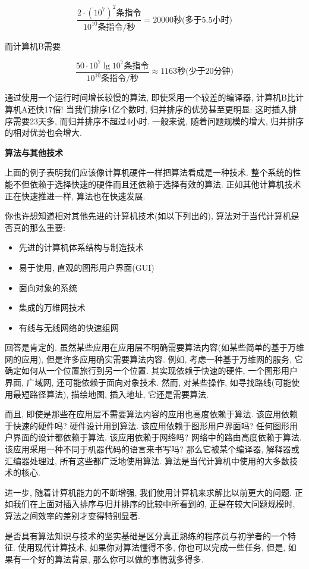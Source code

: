 \documentclass[oneside,10pt,fontset=none]{ctexbook}
\numberwithin{definition}{chapter}
\numberwithin{theorem}{chapter}
\numberwithin{proof}{chapter}
\begin{document}
$$
\frac{2\cdot (10^7)^2\text{条指令}}{10^10\text{条指令/秒}} = 20000\text{秒(多于5.5小时)}
$$

而计算机B需要

$$
\frac{50\cdot 10^7\lg{10^7}\text{条指令}}{10^10\text{条指令/秒}} \approx 1163\text{秒(少于20分钟)}
$$

通过使用一个运行时间增长较慢的算法, 即使采用一个较差的编译器, 计算机B比计算机A还快17倍! 当我们排序1亿个数时, 归并排序的优势甚至更明显: 这时插入排序需要23天多, 而归并排序不超过4小时. 一般来说, 随着问题规模的增大, 归并排序的相对优势也会增大.

\textbf{算法与其他技术}

上面的例子表明我们应该像计算机硬件一样把算法看成是一种技术. 整个系统的性能不但依赖于选择快速的硬件而且还依赖于选择有效的算法. 正如其他计算机技术正在快速推进一样, 算法也在快速发展.

你也许想知道相对其他先进的计算机技术(如以下列出的), 算法对于当代计算机是否真的那么重要:

\begin{itemize}
    \item 先进的计算机体系结构与制造技术
    \item 易于使用, 直观的图形用户界面(GUI)
    \item 面向对象的系统
    \item 集成的万维网技术
    \item 有线与无线网络的快速组网
\end{itemize}

回答是肯定的. 虽然某些应用在应用层不明确需要算法内容(如某些简单的基于万维网的应用), 但是许多应用确实需要算法内容. 例如, 考虑一种基于万维网的服务, 它确定如何从一个位置旅行到另一个位置. 其实现依赖于快速的硬件, 一个图形用户界面, 广域网, 还可能依赖于面向对象技术. 然而, 对某些操作, 如寻找路线(可能使用最短路径算法), 描绘地图, 插入地址, 它还是需要算法.

而且, 即使是那些在应用层不需要算法内容的应用也高度依赖于算法. 该应用依赖于快速的硬件吗? 硬件设计用到算法. 该应用依赖于图形用户界面吗? 任何图形用户界面的设计都依赖于算法. 该应用依赖于网络吗? 网络中的路由高度依赖于算法. 该应用采用一种不同于机器代码的语言来书写吗? 那么它被某个编译器, 解释器或汇编器处理过, 所有这些都广泛地使用算法. 算法是当代计算机中使用的大多数技术的核心.

进一步, 随着计算机能力的不断增强, 我们使用计算机来求解比以前更大的问题. 正如我们在上面对插入排序与归并排序的比较中所看到的, 正是在较大问题规模时, 算法之间效率的差别才变得特别显著.

是否具有算法知识与技术的坚实基础是区分真正熟练的程序员与初学者的一个特征. 使用现代计算技术, 如果你对算法懂得不多, 你也可以完成一些任务, 但是, 如果有一个好的算法背景, 那么你可以做的事情就多得多.
\end{document}

